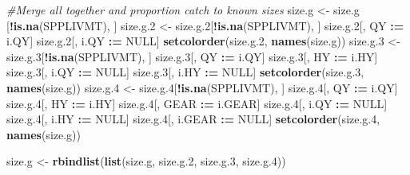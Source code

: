 \documentclass[]{article}
\newenvironment{Shaded}{\begin{snugshade}}{\end{snugshade}}
\newcommand{\KeywordTok}[1]{\textcolor[rgb]{0.13,0.29,0.53}{\textbf{#1}}}
\newcommand{\DecValTok}[1]{\textcolor[rgb]{0.00,0.00,0.81}{#1}}
\newcommand{\StringTok}[1]{\textcolor[rgb]{0.31,0.60,0.02}{#1}}
\newcommand{\CommentTok}[1]{\textcolor[rgb]{0.56,0.35,0.01}{\textit{#1}}}
\newcommand{\OtherTok}[1]{\textcolor[rgb]{0.56,0.35,0.01}{#1}}
\newcommand{\OperatorTok}[1]{\textcolor[rgb]{0.81,0.36,0.00}{\textbf{#1}}}
\newcommand{\ErrorTok}[1]{\textcolor[rgb]{0.64,0.00,0.00}{\textbf{#1}}}
\newcommand{\NormalTok}[1]{#1}
\begin{document}
\begin{Shaded}
\begin{Highlighting}[]
  \CommentTok{#Merge all together and proportion catch to known sizes}
\NormalTok{  size.g   <-}\StringTok{ }\NormalTok{size.g  [}\OperatorTok{!}\KeywordTok{is.na}\NormalTok{(SPPLIVMT), ]}
\NormalTok{  size.g.}\DecValTok{2}\NormalTok{ <-}\StringTok{ }\NormalTok{size.g.}\DecValTok{2}\NormalTok{[}\OperatorTok{!}\KeywordTok{is.na}\NormalTok{(SPPLIVMT), ]}
\NormalTok{  size.g.}\DecValTok{2}\NormalTok{[, QY   }\OperatorTok{:}\ErrorTok{=}\StringTok{ }\NormalTok{i.QY]}
\NormalTok{  size.g.}\DecValTok{2}\NormalTok{[, i.QY }\OperatorTok{:}\ErrorTok{=}\StringTok{ }\OtherTok{NULL}\NormalTok{]}
  \KeywordTok{setcolorder}\NormalTok{(size.g.}\DecValTok{2}\NormalTok{, }\KeywordTok{names}\NormalTok{(size.g))}
\NormalTok{  size.g.}\DecValTok{3}\NormalTok{ <-}\StringTok{ }\NormalTok{size.g.}\DecValTok{3}\NormalTok{[}\OperatorTok{!}\KeywordTok{is.na}\NormalTok{(SPPLIVMT), ]}
\NormalTok{  size.g.}\DecValTok{3}\NormalTok{[, QY   }\OperatorTok{:}\ErrorTok{=}\StringTok{ }\NormalTok{i.QY]}
\NormalTok{  size.g.}\DecValTok{3}\NormalTok{[, HY   }\OperatorTok{:}\ErrorTok{=}\StringTok{ }\NormalTok{i.HY]}
\NormalTok{  size.g.}\DecValTok{3}\NormalTok{[, i.QY }\OperatorTok{:}\ErrorTok{=}\StringTok{ }\OtherTok{NULL}\NormalTok{]}
\NormalTok{  size.g.}\DecValTok{3}\NormalTok{[, i.HY }\OperatorTok{:}\ErrorTok{=}\StringTok{ }\OtherTok{NULL}\NormalTok{]}
  \KeywordTok{setcolorder}\NormalTok{(size.g.}\DecValTok{3}\NormalTok{, }\KeywordTok{names}\NormalTok{(size.g))}
\NormalTok{  size.g.}\DecValTok{4}\NormalTok{ <-}\StringTok{ }\NormalTok{size.g.}\DecValTok{4}\NormalTok{[}\OperatorTok{!}\KeywordTok{is.na}\NormalTok{(SPPLIVMT), ]}
\NormalTok{  size.g.}\DecValTok{4}\NormalTok{[, QY     }\OperatorTok{:}\ErrorTok{=}\StringTok{ }\NormalTok{i.QY]}
\NormalTok{  size.g.}\DecValTok{4}\NormalTok{[, HY     }\OperatorTok{:}\ErrorTok{=}\StringTok{ }\NormalTok{i.HY]}
\NormalTok{  size.g.}\DecValTok{4}\NormalTok{[, GEAR   }\OperatorTok{:}\ErrorTok{=}\StringTok{ }\NormalTok{i.GEAR]}
\NormalTok{  size.g.}\DecValTok{4}\NormalTok{[, i.QY   }\OperatorTok{:}\ErrorTok{=}\StringTok{ }\OtherTok{NULL}\NormalTok{]}
\NormalTok{  size.g.}\DecValTok{4}\NormalTok{[, i.HY   }\OperatorTok{:}\ErrorTok{=}\StringTok{ }\OtherTok{NULL}\NormalTok{]}
\NormalTok{  size.g.}\DecValTok{4}\NormalTok{[, i.GEAR }\OperatorTok{:}\ErrorTok{=}\StringTok{ }\OtherTok{NULL}\NormalTok{]}
  \KeywordTok{setcolorder}\NormalTok{(size.g.}\DecValTok{4}\NormalTok{, }\KeywordTok{names}\NormalTok{(size.g))}
  
\NormalTok{  size.g <-}\StringTok{ }\KeywordTok{rbindlist}\NormalTok{(}\KeywordTok{list}\NormalTok{(size.g, size.g.}\DecValTok{2}\NormalTok{, size.g.}\DecValTok{3}\NormalTok{, size.g.}\DecValTok{4}\NormalTok{))}
  

\end{Highlighting}
\end{Shaded}
\end{document}
